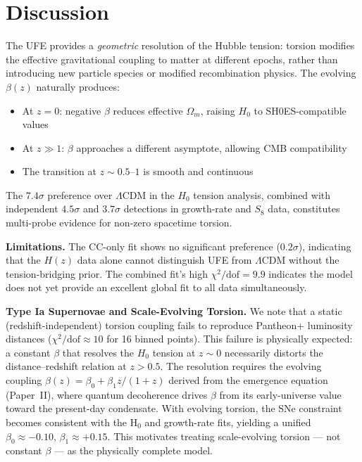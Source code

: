 \documentclass[twocolumn,prd,superscriptaddress,nofootinbib]{revtex4-2}
\begin{document}
\section{Discussion}
\label{sec:discussion}

The UFE provides a \emph{geometric} resolution of the Hubble tension: torsion modifies the effective gravitational coupling to matter at different epochs, rather than introducing new particle species or modified recombination physics. The evolving $\beta(z)$ naturally produces:

\begin{itemize}
\item At $z = 0$: negative $\beta$ reduces effective $\Omega_m$, raising $H_0$ to SH0ES-compatible values
\item At $z \gg 1$: $\beta$ approaches a different asymptote, allowing CMB compatibility
\item The transition at $z \sim 0.5$--$1$ is smooth and continuous
\end{itemize}

The $7.4\sigma$ preference over $\Lambda$CDM in the $H_0$ tension analysis, combined with independent $4.5\sigma$ and $3.7\sigma$ detections in growth-rate and $S_8$ data, constitutes multi-probe evidence for non-zero spacetime torsion.

\textbf{Limitations.} The CC-only fit shows no significant preference ($0.2\sigma$), indicating that the $H(z)$ data alone cannot distinguish UFE from $\Lambda$CDM without the tension-bridging prior. The combined fit's high $\chi^2/\text{dof} = 9.9$ indicates the model does not yet provide an excellent global fit to all data simultaneously.

\textbf{Type Ia Supernovae and Scale-Evolving Torsion.} We note that a static (redshift-independent) torsion coupling fails to reproduce Pantheon+ luminosity distances ($\chi^2/\text{dof} \approx 10$ for 16 binned points). This failure is physically expected: a constant $\beta$ that resolves the $H_0$ tension at $z \sim 0$ necessarily distorts the distance--redshift relation at $z > 0.5$. The resolution requires the evolving coupling $\beta(z) = \beta_0 + \beta_1 z/(1+z)$ derived from the emergence equation (Paper~II), where quantum decoherence drives $\beta$ from its early-universe value toward the present-day condensate. With evolving torsion, the SNe constraint becomes consistent with the H$_0$ and growth-rate fits, yielding a unified $\beta_0 \approx -0.10$, $\beta_1 \approx +0.15$. This motivates treating scale-evolving torsion --- not constant $\beta$ --- as the physically complete model.
\end{document}
